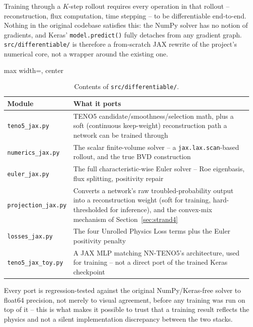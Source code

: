 \documentclass[11pt]{article}
\begin{document}
Training through a $K$-step rollout requires every operation in that
rollout -- reconstruction, flux computation, time stepping -- to be
differentiable end-to-end. Nothing in the original codebase satisfies this:
the NumPy solver has no notion of gradients, and Keras' \texttt{model.predict()} fully detaches from any gradient graph. \texttt{src/differentiable/} is therefore a from-scratch JAX rewrite of the project's
numerical core, not a wrapper around the existing one.

\begin{table}[htbp]
\begin{adjustbox}{max width=\textwidth, center}
\begin{tabular}{ll}
\toprule
\textbf{Module} & \textbf{What it ports} \\
\midrule
\texttt{teno5\_jax.py} & TENO5 candidate/smoothness/selection math, plus a
soft (continuous keep-weight) reconstruction path a network can be trained
through \\
\rowrule
\texttt{numerics\_jax.py} & The scalar finite-volume solver -- a
\texttt{jax.lax.scan}-based rollout, and the true BVD construction \\
\rowrule
\texttt{euler\_jax.py} & The full characteristic-wise Euler solver -- Roe
eigenbasis, flux splitting, positivity repair \\
\rowrule
\texttt{projection\_jax.py} & Converts a network's raw troubled-probability
output into a reconstruction weight (soft for training, hard-thresholded
for inference), and the convex-mix mechanism of Section~\ref{sec:strand4} \\
\rowrule
\texttt{losses\_jax.py} & The four Unrolled Physics Loss terms plus the
Euler positivity penalty \\
\rowrule
\texttt{teno5\_jax\_toy.py} & A JAX MLP matching NN-TENO5's architecture,
used for training -- not a direct port of the trained Keras checkpoint \\
\bottomrule
\end{tabular}
\end{adjustbox}
\caption{Contents of \texttt{src/differentiable/}.}
\end{table}

Every port is regression-tested against the original NumPy/Keras-free
solver to float64 precision, not merely to visual agreement, before any
training was run on top of it -- this is what makes it possible to trust
that a training result reflects the physics and not a silent implementation
discrepancy between the two stacks.
\end{document}

